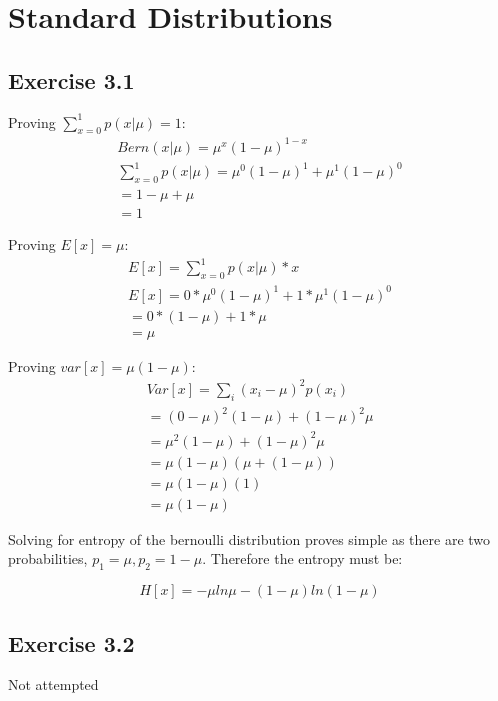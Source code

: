 \section{Standard Distributions}

\subsection{Exercise 3.1}
Proving $\sum_{x=0}^{1}p(x|\mu) = 1$: 
\begin{gather}
  Bern(x|\mu) = \mu^x(1-\mu)^{1-x} \\
  \sum_{x=0}^{1}p(x|\mu) = \mu^0(1-\mu)^1 + \mu^1(1-\mu)^0 \\
  = 1-\mu + \mu \\
   = 1
\end{gather}

Proving $E[x] = \mu$:
\begin{gather}
  E[x] = \sum_{x=0}^{1}p(x|\mu)*x \\
  E[x] = 0*\mu^0(1-\mu)^1 + 1 * \mu^1(1-\mu)^0 \\
  = 0*(1-\mu) + 1*\mu \\
  = \mu
\end{gather}

Proving $var[x] = \mu(1-\mu)$:
\begin{gather}
  Var[x] = \sum_{i}(x_i - \mu)^2p(x_i) \\
  = (0-\mu)^2(1-\mu) + (1-\mu)^2\mu \\
  = \mu^2(1-\mu) + (1-\mu)^2\mu \\
  = \mu(1-\mu)(\mu+(1-\mu)) \\
  = \mu(1-\mu)(1) \\
  = \mu(1-\mu)
\end{gather}

Solving for entropy of the bernoulli distribution proves simple as there are two probabilities, $p_1 = \mu, p_2 = 1-\mu$. Therefore the entropy must be:

\begin{equation}
  H[x] = -\mu ln \mu - (1-\mu)ln(1-\mu)
\end{equation}


\subsection{Exercise 3.2}
Not attempted

